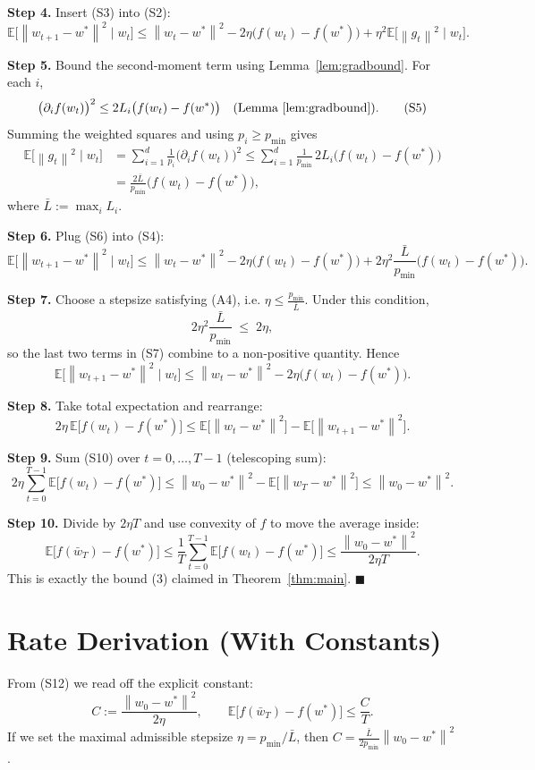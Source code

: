 \documentclass{article}
\newcommand{\E}{\mathbb{E}}
\newcommand{\norm}[1]{\left\|#1\right\|}
\begin{document}
\noindent\textbf{Step 4.} Insert (S3) into (S2):
\[
\E\!\big[\norm{w_{t+1}-w^*}^2\mid w_t\big]
\le \norm{w_t-w^*}^2-2\eta\big(f(w_t)-f(w^*)\big)
      +\eta^2\E\!\big[\norm{g_t}^2\mid w_t\big].
\tag{S4}
\]

\noindent\textbf{Step 5.} Bound the second‑moment term using Lemma~\ref{lem:gradbound}.
For each $i$,
\[
\big(\partial_i f(w_t)\big)^2\le 2L_i\big(f(w_t)-f(w^*)\big)
\quad\text{(Lemma~\ref{lem:gradbound})}.
\tag{S5}
\]
Summing the weighted squares and using $p_i\ge p_{\min}$ gives
\[
\begin{aligned}
\E\!\big[\norm{g_t}^2\mid w_t\big]
&= \sum_{i=1}^d\frac{1}{p_i}\big(\partial_i f(w_t)\big)^2
   \le \sum_{i=1}^d\frac{1}{p_{\min}}\,2L_i\big(f(w_t)-f(w^*)\big) \\
&= \frac{2\bar L}{p_{\min}}\big(f(w_t)-f(w^*)\big),
\end{aligned}
\tag{S6}
\]
where $\displaystyle\bar L:=\max_i L_i$.

\noindent\textbf{Step 6.} Plug (S6) into (S4):
\[
\E\!\big[\norm{w_{t+1}-w^*}^2\mid w_t\big]
\le \norm{w_t-w^*}^2
   -2\eta\big(f(w_t)-f(w^*)\big)
   +2\eta^2\frac{\bar L}{p_{\min}}\big(f(w_t)-f(w^*)\big).
\tag{S7}
\]

\noindent\textbf{Step 7.} Choose a stepsize satisfying (A4), i.e. $\displaystyle\eta\le\frac{p_{\min}}{\bar L}$.
Under this condition,
\[
2\eta^2\frac{\bar L}{p_{\min}}\;\le\;2\eta,
\tag{S8}
\]
so the last two terms in (S7) combine to a non‑positive quantity. Hence
\[
\E\!\big[\norm{w_{t+1}-w^*}^2\mid w_t\big]
\le \norm{w_t-w^*}^2-2\eta\big(f(w_t)-f(w^*)\big).
\tag{S9}
\]

\noindent\textbf{Step 8.} Take total expectation and rearrange:
\[
2\eta\,\E\!\big[f(w_t)-f(w^*)\big]\le
\E\!\big[\norm{w_t-w^*}^2\big]-\E\!\big[\norm{w_{t+1}-w^*}^2\big].
\tag{S10}
\]

\noindent\textbf{Step 9.} Sum (S10) over $t=0,\dots,T-1$ (telescoping sum):
\[
2\eta\sum_{t=0}^{T-1}\E\!\big[f(w_t)-f(w^*)\big]
\le \norm{w_0-w^*}^2-\E\!\big[\norm{w_T-w^*}^2\big]
\le \norm{w_0-w^*}^2.
\tag{S11}
\]

\noindent\textbf{Step 10.} Divide by $2\eta T$ and use convexity of $f$ to move the average inside:
\[
\E\!\big[f(\bar w_T)-f(w^*)\big]
\le\frac{1}{T}\sum_{t=0}^{T-1}\E\!\big[f(w_t)-f(w^*)\big]
\le\frac{\norm{w_0-w^*}^2}{2\eta T}.
\tag{S12}
\]
This is exactly the bound (3) claimed in Theorem~\ref{thm:main}. \hfill $\blacksquare$

\section*{Rate Derivation (With Constants)}
From (S12) we read off the explicit constant:
\[
C:=\frac{\norm{w_0-w^*}^2}{2\eta},
\qquad
\E\!\big[f(\bar w_T)-f(w^*)\big]\le \frac{C}{T}.
\]
If we set the maximal admissible stepsize $\eta = p_{\min}/\bar L$, then
$C = \frac{\bar L}{2p_{\min}}\norm{w_0-w^*}^2$.
\end{document}
